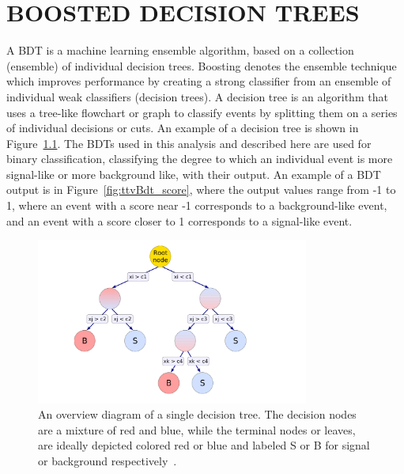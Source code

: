 %
%

\chapter{BOOSTED DECISION TREES}
\label{app:bdts}

A BDT is a machine learning ensemble algorithm, based on a collection (ensemble) of individual decision trees. Boosting denotes the ensemble technique
which improves performance by creating a strong classifier from an ensemble of individual weak classifiers (decision trees). A decision tree
is an algorithm that uses a tree-like flowchart or graph to classify events by splitting them on a series of individual decisions or cuts. An example of a decision tree
is shown in Figure~\ref{fig:dec_tree}. The BDTs used in this analysis and described here are used for binary classification, classifying the degree to which an
individual event is more signal-like or more background like, with their output.
An example of a BDT output is in Figure~\ref{fig:ttvBdt_score}, where the output values range from -1 to 1, where an event with a score near -1 corresponds
to a background-like event, and an event with a score closer to 1 corresponds to a signal-like event.

\begin{figure}[hbtp]
 \begin{center}
   \includegraphics[width=0.8\textwidth]{ap1_figs/decision_tree.pdf}
   \caption[A decision tree diagram.]{An overview diagram of a single decision tree. The decision nodes are a mixture of red and blue,
     while the terminal nodes or leaves, are ideally depicted colored red or blue and labeled S or B for signal or background respectively~\cite{tmva}.}
   \label{fig:dec_tree}
 \end{center}
\end{figure}

